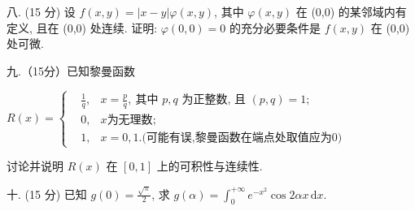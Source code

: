 \documentclass{examcollection}
\begin{document}
{\begin{minipage}{\textwidth}
八. (15 分) 设 $f(x, y) = |x - y| \varphi(x, y)$, 其中 $\varphi(x, y)$ 在 (0,0) 的某邻域内有定义, 且在 (0,0) 处连续. 证明: $\varphi(0,0) = 0$ 的充分必要条件是 $f(x, y)$ 在 (0,0) 处可微.\par
九.（15分）已知黎曼函数\par
$R(x)=\left\{\begin{aligned}&\frac{1}{q},&x=\frac{p}{q},\ \text{其中 }p,q\text{ 为正整数, 且 }(p,q)=1;\\ &0,&x\text{为无理数};\\ &1,&x=0,1.\text{(可能有误,黎曼函数在端点处取值应为0)}\end{aligned}\right.$\par
讨论并说明  $R(x)$  在  $[0,1]$  上的可积性与连续性.\par
十. (15 分) 已知 $g(0) = \frac{\sqrt{\pi}}{2}$, 求 $g(\alpha) = \int_{0}^{+\infty} e^{-x^2} \cos 2\alpha x \, \mathrm{d}x$.\par
\end{minipage}}
\ifdim\dimexpr\ht\proofbox+\dp\proofbox\relax>\textheight
\noindent\resizebox{!}{\textheight}{\usebox{\proofbox}}\else\noindent\usebox{\proofbox}\fi\clearpage
\end{document}
